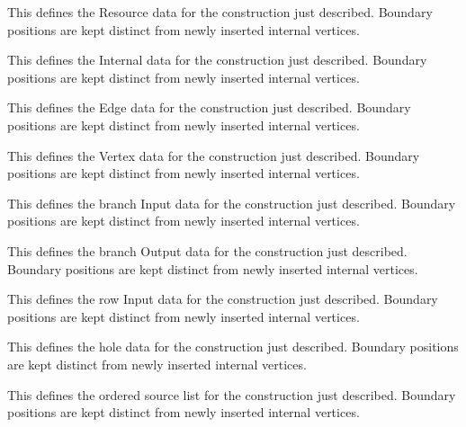 This defines the Resource data for the construction just described. Boundary positions are kept distinct from newly inserted internal vertices.
\par{}

This defines the Internal data for the construction just described. Boundary positions are kept distinct from newly inserted internal vertices.
\par{}

This defines the Edge data for the construction just described. Boundary positions are kept distinct from newly inserted internal vertices.
\par{}

This defines the Vertex data for the construction just described. Boundary positions are kept distinct from newly inserted internal vertices.
\par{}

This defines the branch Input data for the construction just described. Boundary positions are kept distinct from newly inserted internal vertices.
\par{}

This defines the branch Output data for the construction just described. Boundary positions are kept distinct from newly inserted internal vertices.
\par{}

This defines the row Input data for the construction just described. Boundary positions are kept distinct from newly inserted internal vertices.
\par{}

This defines the hole data for the construction just described. Boundary positions are kept distinct from newly inserted internal vertices.
\par{}

This defines the ordered source list for the construction just described. Boundary positions are kept distinct from newly inserted internal vertices.
\par{}

